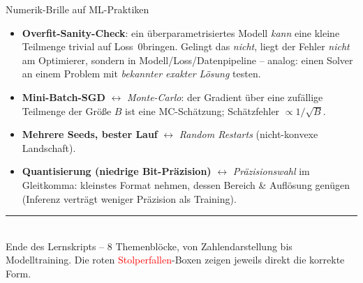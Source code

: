 \documentclass[a4paper,11pt]{article}
\begin{document}
\begin{satz}{Numerik-Brille auf ML-Praktiken}
\begin{itemize}
\item \textbf{Overfit-Sanity-Check}: ein überparametrisiertes Modell \emph{kann} eine kleine
  Teilmenge trivial auf Loss~$0$bringen. Gelingt das \emph{nicht}, liegt der Fehler \emph{nicht} am
  Optimierer, sondern in Modell/Loss/Datenpipeline -- analog: einen Solver an einem Problem mit
  \emph{bekannter exakter Lösung} testen.
\item \textbf{Mini-Batch-SGD} $\leftrightarrow$ \emph{Monte-Carlo}: der Gradient über eine zufällige
  Teilmenge der Größe $B$ ist eine MC-Schätzung; Schätzfehler $\propto 1/\sqrt B$.
\item \textbf{Mehrere Seeds, bester Lauf} $\leftrightarrow$ \emph{Random Restarts} (nicht-konvexe
  Landschaft).
\item \textbf{Quantisierung (niedrige Bit-Präzision)} $\leftrightarrow$ \emph{Präzisionswahl} im
  Gleitkomma: kleinstes Format nehmen, dessen Bereich \& Auflösung genügen (Inferenz verträgt
  weniger Präzision als Training).
\end{itemize}
\end{satz}

\vspace{6pt}
\noindent\textcolor{rulecol}{\rule{\linewidth}{0.4pt}}\\[2pt]
{\small\color{muted} Ende des Lernskripts -- 8 Themenblöcke, von Zahlendarstellung bis Modelltraining.
Die roten \textcolor{red}{Stolperfallen}-Boxen zeigen jeweils direkt die korrekte Form.}
\end{document}
